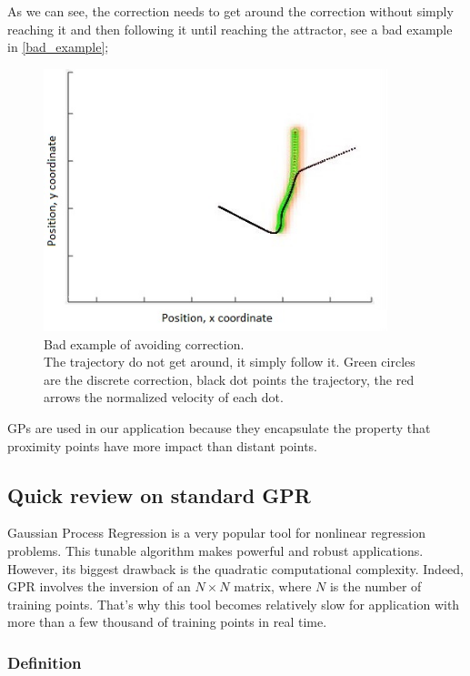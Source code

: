 As we can see, the correction needs to get around the correction without simply reaching it and then following it until reaching the attractor, see a bad example in \autoref{bad_example};

\begin{figure}[H]
\centering
\includegraphics[width=10cm]{img/bad_example.jpg}
\caption{Bad example of avoiding correction.\\\hspace{0cm}The trajectory do not get around, it simply follow it. Green circles are the discrete correction, black dot points the trajectory, the red arrows the normalized velocity of each dot.}
\label{bad_example}
\end{figure}

GPs are used in our application because they encapsulate the property that proximity points have more impact than distant points.

\subsection{Quick review on standard GPR}

Gaussian Process Regression is a very popular tool for nonlinear regression problems. This tunable algorithm makes powerful and robust applications. However, its biggest drawback is the quadratic computational complexity. Indeed, GPR involves the inversion of an $N \times N$ matrix, where $N$ is the number of training points. That's why this tool becomes relatively slow for application
with more than a few thousand of training points in real time.\\

\subsubsection{Definition}

